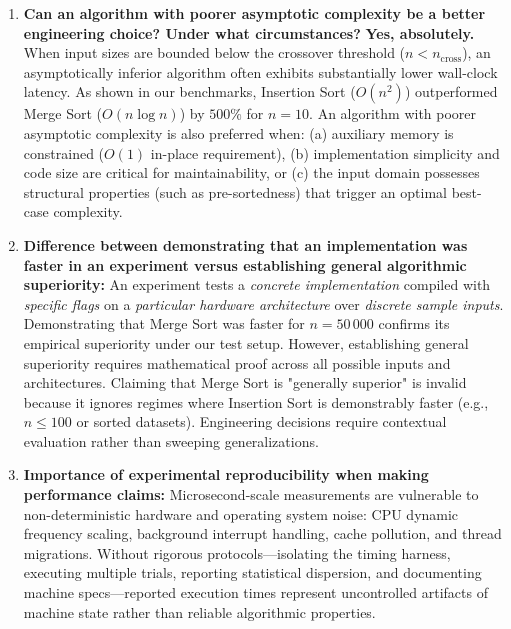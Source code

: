 \documentclass[11pt]{article}
\begin{document}
\begin{enumerate}[itemsep=0.15em, topsep=0.1em]
    \item \textbf{Can an algorithm with poorer asymptotic complexity be a better engineering choice? Under what circumstances?}
    \textbf{Yes, absolutely.} When input sizes are bounded below the crossover threshold ($n < n_{\text{cross}}$), an asymptotically inferior algorithm often exhibits substantially lower wall-clock latency. As shown in our benchmarks, Insertion Sort ($O(n^2)$) outperformed Merge Sort ($O(n \log n)$) by $500\%$ for $n = 10$. An algorithm with poorer asymptotic complexity is also preferred when: (a) auxiliary memory is constrained ($O(1)$ in-place requirement), (b) implementation simplicity and code size are critical for maintainability, or (c) the input domain possesses structural properties (such as pre-sortedness) that trigger an optimal best-case complexity.

    \item \textbf{Difference between demonstrating that an implementation was faster in an experiment versus establishing general algorithmic superiority:}
    An experiment tests a \textit{concrete implementation} compiled with \textit{specific flags} on a \textit{particular hardware architecture} over \textit{discrete sample inputs}. Demonstrating that Merge Sort was faster for $n=50\,000$ confirms its empirical superiority under our test setup. However, establishing general superiority requires mathematical proof across all possible inputs and architectures. Claiming that Merge Sort is "generally superior" is invalid because it ignores regimes where Insertion Sort is demonstrably faster (e.g., $n \le 100$ or sorted datasets). Engineering decisions require contextual evaluation rather than sweeping generalizations.

    \item \textbf{Importance of experimental reproducibility when making performance claims:}
    Microsecond-scale measurements are vulnerable to non-deterministic hardware and operating system noise: CPU dynamic frequency scaling, background interrupt handling, cache pollution, and thread migrations. Without rigorous protocols---isolating the timing harness, executing multiple trials, reporting statistical dispersion, and documenting machine specs---reported execution times represent uncontrolled artifacts of machine state rather than reliable algorithmic properties.
\end{enumerate}

\newpage
\end{document}
